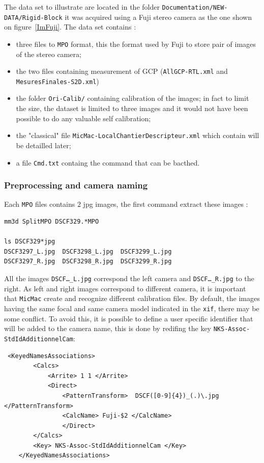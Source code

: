 The data set to illustrate are located in the folder {\tt Documentation/NEW-DATA/Rigid-Block} it was acquired using
a Fuji stereo camera as the one shown on figure~\ref{ImFuji}. The data set contains :

\begin{itemize}
    \item three files to {\tt MPO}  format, this the format used by Fuji to store pair of images of the stereo camera;
    \item the two files containing measurement of GCP ({\tt AllGCP-RTL.xml} and {\tt MesuresFinales-S2D.xml})
    \item the folder {\tt Ori-Calib/} containing calibration of the images; in fact to limit the size, the dataset
          is limited to three images and it would not have been possible to do any valuable self calibration;

    \item the "classical" file {\tt MicMac-LocalChantierDescripteur.xml} which contain will be detailled later;
    \item a file {\tt Cmd.txt} containg the command that can be bacthed.
\end{itemize}


\subsubsection{Preprocessing and camera naming}

Each {\tt MPO} files contains $2$ jpg images, the first  command extract these images : 

\begin{verbatim}
mm3d SplitMPO DSCF329.*MPO

ls DSCF329*jpg
DSCF3297_L.jpg	DSCF3298_L.jpg	DSCF3299_L.jpg
DSCF3297_R.jpg	DSCF3298_R.jpg	DSCF3299_R.jpg
\end{verbatim}

All the images {\tt DSCF\dots\_L.jpg} correspond the left camera and {\tt DSCF\dots\_R.jpg} to the right.
As left and right images correspond to different  camera, it is important that {\tt MicMac} create
and recognize different calibration files. By default, the images having the same focal and same camera
model indicated in the {\tt xif}, there may be some conflict. To avoid this, it is possible to define
a user specific identifier that will be added to the camera name, this is done by redifing the key
{\tt NKS-Assoc-StdIdAdditionnelCam}:

\begin{verbatim}
 <KeyedNamesAssociations>
        <Calcs>
            <Arrite> 1 1 </Arrite>
            <Direct>
                <PatternTransform>  DSCF([0-9]{4})_(.)\.jpg </PatternTransform>
                <CalcName> Fuji-$2 </CalcName>
                </Direct>
        </Calcs>
        <Key> NKS-Assoc-StdIdAdditionnelCam </Key>
    </KeyedNamesAssociations>
\end{verbatim}

